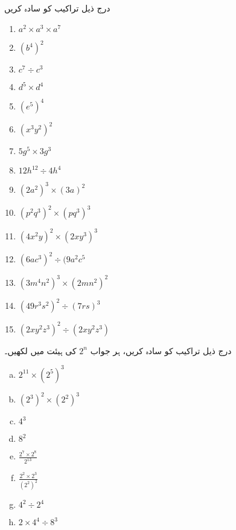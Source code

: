 درج ذیل تراکیب کو سادہ کریں
\begin{multicols}{3}
\begin{enumerate}[.a]
\item
\(a^{2}\times a^{3}\times a^{7}\)
\item
\((b^{4})^{2}\)
\item
\(c^{7}\div c^{3}\)
\item
\(d^{5}\times d^{4}\)
\item
\((e^{5})^{4}\)
\item
\((x^{3}y^{2})^{2}\)
\item
\(5g^{5}\times3g^{3}\)
\item
\(12h^{12}\div 4h^{4}\)
\item
\((2a^{2})^{3}\times(3a)^{2}\)
\item
\((p^{2}q^{3})^{2}\times(pq^{3})^{3}\)
\item
\((4x^{2}y)^{2}\times(2xy^{3})^{3}\)
\item
\((6ac^{3})^{2}\div(9a^{2}c^{5}\)
\item
\((3m^{4}n^{2})^{3}\times(2mn^{2})^{2}\)
\item
\((49r^{3}s^{2})^{2}\div(7rs)^{3}\)
\item
\((2xy^{2}z^{3})^{2}\div(2xy^{2}z^{3})\)

\end{enumerate}
\end{multicols}


درج ذیل تراکیب کو سادہ کریں، ہر جواب 
\(2^{n}\) کی  ہیئت میں لکھیں۔

\begin{multicols}{2}
\begin{enumerate}[a.]
\item
\(2^{11}\times(2^{5})^{3}\)
\item
\((2^{3})^{2}\times(2^{2})^{3}\)
\item
\(4^{3}\)
\item
\(8^{2}\)
\item
\(\frac{2^{7}\times 2^{8}}{2^{13}}\)
\item
\(\frac{2^{2}\times 2^{3}}{(2^{2})^{2}}\)
\item
\(4^{2}\div 2^{4}\)
\item
\(2\times 4^{4}\div 8^{3}\)
\end{enumerate}
\end{multicols}


